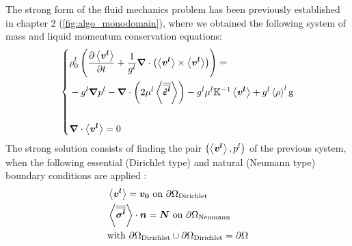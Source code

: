 The strong form of the fluid mechanics problem has been previously established in chapter 2 (\cref{fig:algo_monodomain}),
where we obtained the following system of mass and liquid momentum conservation equations:
\begin{equation}
   \label{eq:vms_strong}
   \left\{
   \begin{aligned}
      & \rholref \brac{\tempup{ \vit } + \frac{1}{\gl} \nabvec \cdot \brac{\vit \times \vit}} = \\
	  &- \gl\nabvec \pl - \nabvec \cdot \brac{2 \mul \strainrateliq}
	  - \gl \mul \K^{-1} \vit + \gl \rhol \gravity\\ \\
      & \nabvec \cdot \vit =0
    \end{aligned}
    \right.
\end{equation}
The strong solution consists of finding the pair 
$\left( \left \langle \boldsymbol{v^l} \right \rangle, {p^l} \right)$ of the previous system, when the following essential (Dirichlet type) and natural (Neumann type) boundary 
conditions are applied :
\begin{align}
& \left \langle \boldsymbol{v^l} \right \rangle = \boldsymbol{v_0} \text{ on } \partial \Omega_\text{Dirichlet}  \\
&  \left \langle {\overline{\overline{\ensuremath{\boldsymbol{\sigma^l}}}}} \right \rangle \cdot \boldsymbol{n} = \boldsymbol{N}  \text{ on } \partial \Omega_\text{Neumann} \\
&\text{with } \partial\Omega_\text{Dirichlet} \cup  \partial\Omega_\text{Dirichlet} = \partial\Omega
\end{align}

